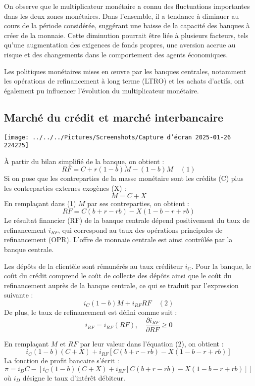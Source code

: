 \documentclass[a4paper, 12pt]{report}
\begin{document}
On observe que le multiplicateur monétaire a connu des fluctuations importantes dans les deux zones monétaires. Dans l'ensemble, il a tendance à diminuer au cours de la période considérée, suggérant une baisse de la capacité des banques à créer de la monnaie. Cette diminution pourrait être liée à plusieurs facteurs, tels qu'une augmentation des exigences de fonds propres, une aversion accrue au risque et des changements dans le comportement des agents économiques.

Les politiques monétaires mises en œuvre par les banques centrales, notamment les opérations de refinancement à long terme (LTRO) et les achats d'actifs, ont également pu influencer l'évolution du multiplicateur monétaire.	
	
\subsection{Marché du crédit et marché interbancaire}
	
\begin{center}
	\texttt{[image: ../../../Pictures/Screenshots/Capture d'écran 2025-01-26 224225]}
\end{center}
	
À partir du bilan simplifié de la banque, on obtient :  
\[
RF = C + r(1-b) M - (1-b) M \quad (1)
\]
Si on pose que les contreparties de la masse monétaire sont les crédits (C) plus les contreparties externes exogènes (X) :  
\[
M = C + X
\]
En remplaçant dans (1) \( M \) par ses contreparties, on obtient :  
\[
RF = C (b+r-rb) - X (1-b-r+rb)
\]
Le résultat financier (RF) de la banque centrale dépend positivement du taux de refinancement \( i_{RF} \), qui correspond au taux des opérations principales de refinancement (OPR). L'offre de monnaie centrale est ainsi contrôlée par la banque centrale.  

Les dépôts de la clientèle sont rémunérés au taux créditeur \( i_C \). Pour la banque, le coût du crédit comprend le coût de collecte des dépôts ainsi que le coût du refinancement auprès de la banque centrale, ce qui se traduit par l'expression suivante :  
\[
i_C (1-b) M + i_{RF} RF \quad (2)
\]
De plus, le taux de refinancement est défini comme suit :  
\[
i_{RF} = i_{RF}(RF), \quad \frac{\partial i_{RF}}{\partial RF} \geq 0
\]

En remplaçant \( M \) et \( RF \) par leur valeur dans l'équation (2), on obtient :  
\[
i_C (1-b) (C+X) + i_{RF} \left[ C (b+r-rb) - X (1-b-r+rb) \right]
\]
La fonction de profit bancaire s'écrit :  
\[
\pi = i_D C - \left[ i_C (1-b) (C+X) + i_{RF} \left[ C (b+r-rb) - X (1-b-r+rb) \right] \right]
\]
où \( i_D \) désigne le taux d'intérêt débiteur.  
\end{document}
